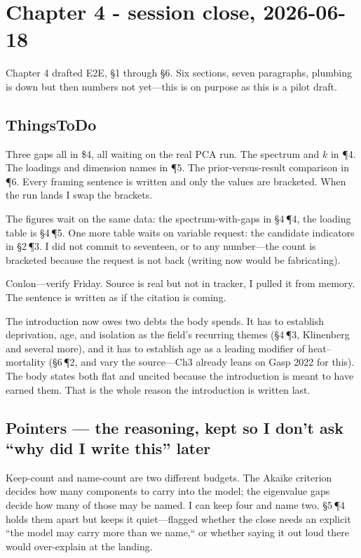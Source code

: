 
\section*{Chapter 4 - session close, 2026-06-18}

Chapter 4 drafted E2E, \S1 through \S6. Six sections, seven paragraphs, plumbing is down but then numbers not yet—this is on purpose as this is a pilot draft.

\subsection*{ThingsToDo}

Three gaps all in \$4, all waiting on the real PCA run. The spectrum and $k$ in \P4. The loadings and dimension names in \P5. The prior-versus-result comparison in \P6. Every framing sentence is written and only the values are bracketed. When the run lands I swap the brackets.

The figures wait on the same data: the spectrum-with-gaps in \S4\,\P4, the loading table is \S4\,\P5. One more table waits on variable request: the candidate indicators in \S2\,\P3. I did not commit to seventeen, or to any number---the count is bracketed because the request is not back (writing now would be fabricating).

Conlon---verify Friday. Source is real but not in tracker, I pulled it from memory. The sentence is written as if the citation is coming. 

The introduction now owes two debts the body spends. It has to establish deprivation, age, and isolation as the field's recurring themes (\S4\,\P3, Klinenberg and several more), and it has to establish age as a leading modifier of heat--mortality (\S6\,\P2, and vary the source---Ch3 already leans on Gasp 2022 for this). The body states both flat and uncited because the introduction is meant to have earned them. That is the whole reason the introduction is written last.

\subsection*{Pointers --- the reasoning, kept so I don't ask ``why did I write this'' later}

Keep-count and name-count are two different budgets. The Akaike criterion decides how many components to carry into the model; the eigenvalue gaps decide how many of those may be named. I can keep four and name two. \S5\,\P4 holds them apart but keeps it quiet---flagged whether the close needs an explicit ``the model may carry more than we name,`` or whether saying it out loud there would over-explain at the landing.

